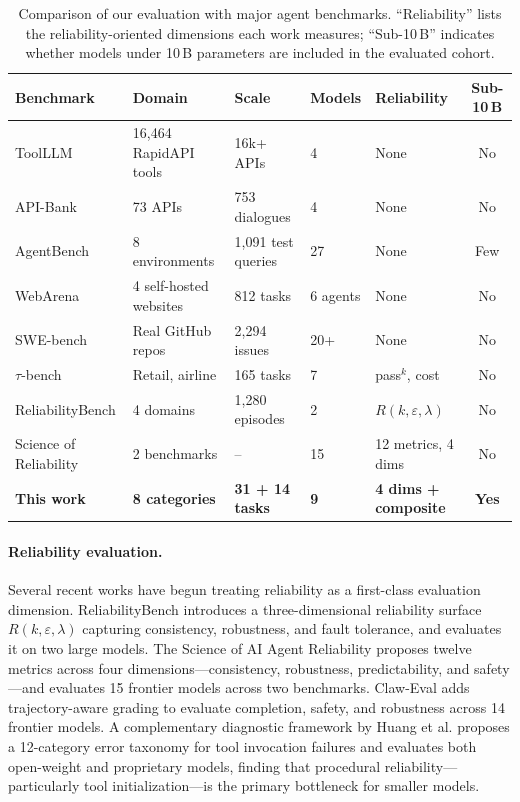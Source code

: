 \begin{table}[t]
\centering
\caption{Comparison of our evaluation with major agent benchmarks. ``Reliability'' lists the reliability-oriented dimensions each work measures; ``Sub-10\,B'' indicates whether models under 10\,B parameters are included in the evaluated cohort.}
\label{tab:benchmark_comparison}
\small
\setlength{\tabcolsep}{4pt}
\begin{tabular}{lllllc}
\toprule
\textbf{Benchmark} & \textbf{Domain} & \textbf{Scale} & \textbf{Models} & \textbf{Reliability} & \textbf{Sub-10\,B} \\
\midrule
ToolLLM \cite{qin2023toollm} & 16{,}464 RapidAPI tools & 16k+ APIs & 4 & None & No \\
API-Bank \cite{li2023apibank} & 73 APIs & 753 dialogues & 4 & None & No \\
AgentBench \cite{liu2024agentbench} & 8 environments & 1{,}091 test queries & 27 & None & Few \\
WebArena \cite{zhou2024webarena} & 4 self-hosted websites & 812 tasks & 6 agents & None & No \\
SWE-bench \cite{jimenez2024swebench} & Real GitHub repos & 2{,}294 issues & 20+ & None & No \\
$\tau$-bench \cite{yao2024tau} & Retail, airline & 165 tasks & 7 & pass$^k$, cost & No \\
ReliabilityBench \cite{gupta2026reliabilitybench} & 4 domains & 1{,}280 episodes & 2 & $R(k,\varepsilon,\lambda)$ & No \\
Science of Reliability \cite{rabanser2026science} & 2 benchmarks & -- & 15 & 12 metrics, 4 dims & No \\
\midrule
\textbf{This work} & \textbf{8 categories} & \textbf{31 + 14 tasks} & \textbf{9} & \textbf{4 dims + composite} & \textbf{Yes} \\
\bottomrule
\end{tabular}
\end{table}

\paragraph{Reliability evaluation.}
Several recent works have begun treating reliability as a first-class evaluation dimension. ReliabilityBench \cite{gupta2026reliabilitybench} introduces a three-dimensional reliability surface $R(k, \varepsilon, \lambda)$ capturing consistency, robustness, and fault tolerance, and evaluates it on two large models. The Science of AI Agent Reliability \cite{rabanser2026science} proposes twelve metrics across four dimensions---consistency, robustness, predictability, and safety---and evaluates 15 frontier models across two benchmarks. Claw-Eval \cite{claw2026eval} adds trajectory-aware grading to evaluate completion, safety, and robustness across 14 frontier models. A complementary diagnostic framework by Huang et al. \cite{huang2026diagnostic} proposes a 12-category error taxonomy for tool invocation failures and evaluates both open-weight and proprietary models, finding that procedural reliability---particularly tool initialization---is the primary bottleneck for smaller models.

